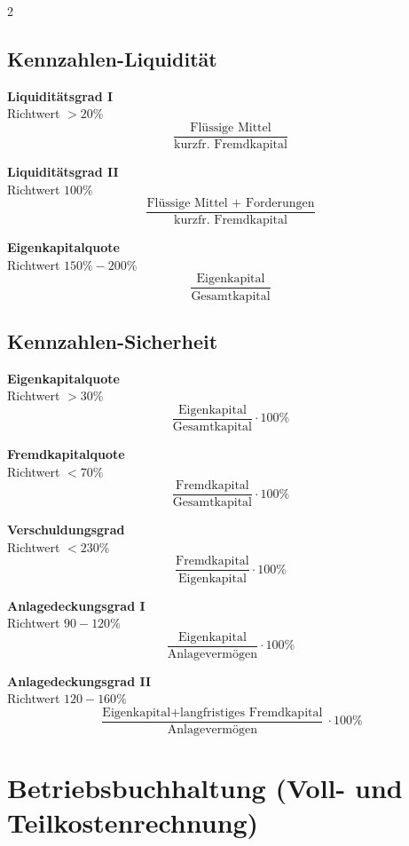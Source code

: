 \documentclass[9pt]{article}
\begin{document}
\begin{multicols}{2}
        \subsection{Kennzahlen-Liquidität}
        
        \textbf{Liquiditätsgrad I}\\
        Richtwert $> 20\%$
        $$\frac{\text{Flüssige Mittel}}{\text{kurzfr. Fremdkapital}}$$
        
        \textbf{Liquiditätsgrad II}\\
        Richtwert $100\%$
        $$\frac{\text{Flüssige Mittel + Forderungen}}{\text{kurzfr. Fremdkapital}}$$
        
        \textbf{Eigenkapitalquote}\\
        Richtwert $150\%-200\%$
        $$\frac{\text{Eigenkapital}}{\text{Gesamtkapital}}$$
        
        \subsection{Kennzahlen-Sicherheit}
        
        \textbf{Eigenkapitalquote}\\
        Richtwert $> 30\%$
        $$\frac{\text{Eigenkapital}}{\text{Gesamtkapital}} \cdot 100\%$$
        
        \textbf{Fremdkapitalquote}\\
        Richtwert $< 70\%$
        $$\frac{\text{Fremdkapital}}{\text{Gesamtkapital}} \cdot 100\%$$
        
        \textbf{Verschuldungsgrad}\\
        Richtwert $< 230\%$
        $$\frac{\text{Fremdkapital}}{\text{Eigenkapital}} \cdot 100\%$$
        
        \textbf{Anlagedeckungsgrad I}\\
        Richtwert $90-120\%$
        $$\frac{\text{Eigenkapital}}{\text{Anlagevermögen}} \cdot 100\%$$
        
        \textbf{Anlagedeckungsgrad II}\\
        Richtwert $120-160\%$
        $$\frac{\text{Eigenkapital} + \text{langfristiges Fremdkapital}}
        {\text{Anlagevermögen}} \cdot 100\%$$
        
        \section{Betriebsbuchhaltung (Voll- und Teilkostenrechnung)}
        

\end{multicols}
\end{document}
